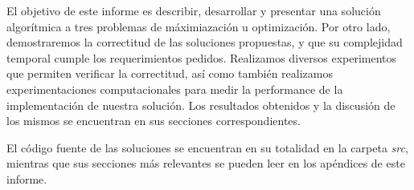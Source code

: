 El objetivo de este informe es describir, desarrollar y presentar una solución algorítmica a tres problemas de máximiazación u optimización. Por otro lado, demostraremos la correctitud de las soluciones propuestas, y que su complejidad temporal cumple los requerimientos pedidos. Realizamos diversos experimentos que permiten verificar la correctitud, así como también realizamos experimentaciones computacionales para medir la performance de la implementación de nuestra solución. Los resultados obtenidos y la discusión de los mismos se encuentran en sus secciones correspondientes.

El código fuente de las soluciones se encuentran en su totalidad en la carpeta \emph{src}, mientras que sus secciones más relevantes se pueden leer en los apéndices de este informe.